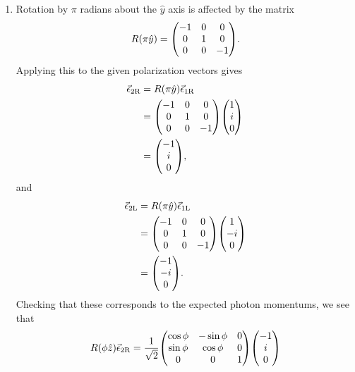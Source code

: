 \documentclass[12pt]{article}
\begin{document}
\begin{enumerate}[label=(\alph*)]
\begin{align*}
        &= \frac{1}{\sqrt{2}}\mqty(\cos\phi + i\sin\phi \\ \sin\phi - i\cos\phi \\ 0) \\
        &= \frac{1}{\sqrt{2}}\mqty(e^{i\phi} \\ ie^{i\phi} \\ 0) \\
        &= e^{i\phi}\vec{\epsilon}_{1\text{L}}.
    \end{align*}
    Thus, $\vec{\epsilon}_{1\text{R}}$ corresponds to a photon state of angular momentum $J_z = +1$, while $\vec{\epsilon}_{1\text{L}}$ corresponds to $J_z = -1$.
    \item Rotation by $\pi$ radians about the $\hat{y}$ axis is affected by the matrix
    \[ R(\pi\hat{y}) = \mqty(-1&0&0\\0&1&0\\0&0&-1). \]
    Applying this to the given polarization vectors gives
    \begin{align*}
        \vec{\epsilon}_{2\text{R}} &= R(\pi\hat{y})\vec{\epsilon}_{1\text{R}} \\
        &= \mqty(-1&0&0\\0&1&0\\0&0&-1)\mqty(1\\i\\0) \\
        &= \mqty(-1\\i\\0),
    \end{align*}
    and 
    \begin{align*}
        \vec{\epsilon}_{2\text{L}} &= R(\pi\hat{y})\vec{\epsilon}_{1\text{L}} \\
        &= \mqty(-1&0&0\\0&1&0\\0&0&-1)\mqty(1\\-i\\0) \\
        &= \mqty(-1\\-i\\0).
    \end{align*}
    Checking that these corresponds to the expected photon momentums, we see that
    \begin{align*}
        R(\phi\hat{z})\vec{\epsilon}_{2\text{R}} &= \frac{1}{\sqrt{2}}\mqty(\cos\phi & -\sin\phi & 0 \\ \sin\phi & \cos\phi & 0 \\ 0 & 0 & 1)\mqty(-1\\i\\0) \\

\end{align*}
\end{enumerate}
\end{document}
